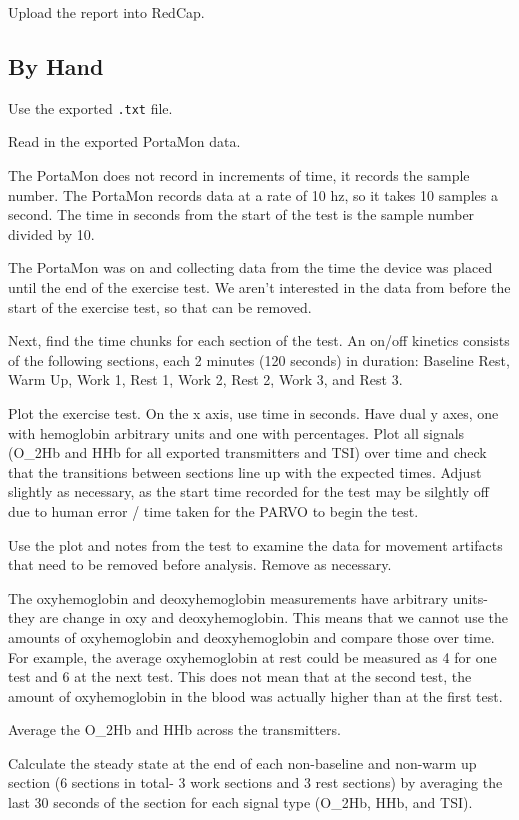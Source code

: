 \documentclass[
]{book}
\begin{document}
Upload the report into RedCap.

\hypertarget{by-hand}{%
\subsection{By Hand}\label{by-hand}}

Use the exported \texttt{.txt} file.

Read in the exported PortaMon data.

The PortaMon does not record in increments of time, it records the sample number. The PortaMon records data at a rate of 10 hz, so it takes 10 samples a second. The time in seconds from the start of the test is the sample number divided by 10.

The PortaMon was on and collecting data from the time the device was placed until the end of the exercise test. We aren't interested in the data from before the start of the exercise test, so that can be removed.

Next, find the time chunks for each section of the test. An on/off kinetics consists of the following sections, each 2 minutes (120 seconds) in duration: Baseline Rest, Warm Up, Work 1, Rest 1, Work 2, Rest 2, Work 3, and Rest 3.

Plot the exercise test. On the x axis, use time in seconds. Have dual y axes, one with hemoglobin arbitrary units and one with percentages. Plot all signals (O\_2Hb and HHb for all exported transmitters and TSI) over time and check that the transitions between sections line up with the expected times. Adjust slightly as necessary, as the start time recorded for the test may be silghtly off due to human error / time taken for the PARVO to begin the test.

Use the plot and notes from the test to examine the data for movement artifacts that need to be removed before analysis. Remove as necessary.

The oxyhemoglobin and deoxyhemoglobin measurements have arbitrary units- they are change in oxy and deoxyhemoglobin. This means that we cannot use the amounts of oxyhemoglobin and deoxyhemoglobin and compare those over time. For example, the average oxyhemoglobin at rest could be measured as 4 for one test and 6 at the next test. This does not mean that at the second test, the amount of oxyhemoglobin in the blood was actually higher than at the first test.

Average the O\_2Hb and HHb across the transmitters.

Calculate the steady state at the end of each non-baseline and non-warm up section (6 sections in total- 3 work sections and 3 rest sections) by averaging the last 30 seconds of the section for each signal type (O\_2Hb, HHb, and TSI).
\end{document}
